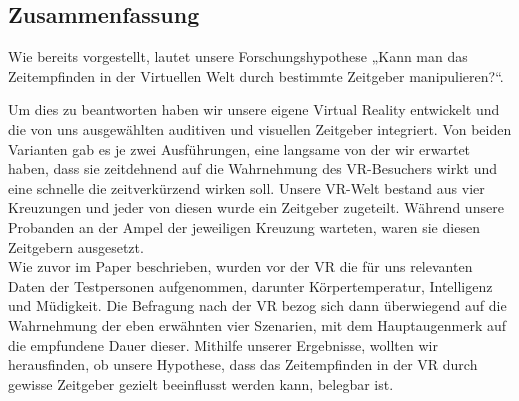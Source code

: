 \documentclass{Bericht}
\begin{document}
\subsection{Zusammenfassung}
Wie bereits vorgestellt, lautet unsere Forschungshypothese „Kann man das Zeitempfinden in der Virtuellen Welt durch bestimmte Zeitgeber manipulieren?“.
\par
Um dies zu beantworten haben wir unsere eigene Virtual Reality entwickelt und die von uns ausgewählten auditiven und visuellen Zeitgeber integriert. Von beiden Varianten gab es je zwei Ausführungen, eine langsame von der wir erwartet haben, dass sie zeitdehnend auf die Wahrnehmung des VR-Besuchers wirkt und eine schnelle die zeitverkürzend wirken soll. Unsere VR-Welt bestand aus vier Kreuzungen und jeder von diesen wurde ein Zeitgeber zugeteilt. Während unsere Probanden an der Ampel der jeweiligen Kreuzung warteten, waren sie diesen Zeitgebern ausgesetzt. 
\\
Wie zuvor im Paper beschrieben, wurden vor der VR  die für uns relevanten Daten der Testpersonen aufgenommen, darunter Körpertemperatur, Intelligenz und Müdigkeit. Die Befragung nach der VR bezog sich dann überwiegend auf die Wahrnehmung der eben erwähnten vier Szenarien, mit dem Hauptaugenmerk auf die empfundene Dauer dieser. Mithilfe unserer Ergebnisse, wollten wir herausfinden, ob unsere Hypothese, dass das Zeitempfinden in der VR durch gewisse Zeitgeber gezielt beeinflusst werden kann, belegbar ist.
\end{document}

